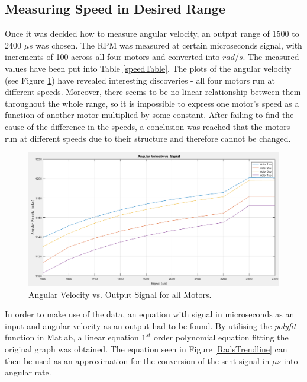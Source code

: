 \subsection{Measuring Speed in Desired Range}
Once it was decided how to measure angular velocity, an output range of 1500 to 2400 $\mu s$ was chosen. The RPM was measured at certain microseconds signal, with increments of 100 across all four motors and converted into $rad/s$. The measured values have been put into Table \ref{speedTable}.
The plots of the angular velocity (see Figure \ref{radsPlots}) have revealed interesting discoveries - all four motors run at different speeds. Moreover, there seems to be no linear relationship between them throughout the whole range, so it is impossible to express one motor's speed as a function of another motor multiplied by some constant. After failing to find the cause of the difference in the speeds, a conclusion was reached that the motors run at different speeds due to their structure and therefore cannot be changed.

\begin{figure}[H]
  \centering
    \includegraphics[width=1\textwidth]{images/radsPlots.png}
	\caption{Angular Velocity vs. Output Signal for all Motors.}
	\label{radsPlots}
\end{figure}

In order to make use of the data, an equation with signal in microseconds as an input and angular velocity as an output had to be found. By utilising the \textit{polyfit} function in Matlab, a linear equation $1^{st}$ order polynomial equation fitting the original graph was obtained. The equation seen in Figure \ref{RadsTrendline} can then be used as an approximation for the conversion of the sent signal in $\mu s$ into angular rate.

